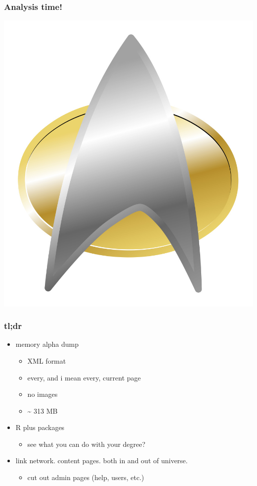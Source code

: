 \documentclass{beamer}
\begin{document}
\begin{frame}
  \frametitle{Analysis time!}
  \begin{center}
    \includegraphics[height = 0.8\textheight, width = \textwidth, keepaspectratio = true]{figure/star-trek-insignia}
  \end{center}
\end{frame}

\begin{frame}
  \frametitle{tl;dr}
  \begin{itemize}
    \item memory alpha dump
      \begin{itemize}
        \item XML format
        \item every, and i mean every, current page
        \item no images
        \item \~{} 313 MB
      \end{itemize}
    \item R plus packages
      \begin{itemize}
        \item see what you can do with your degree?
      \end{itemize}
    \item link network. content pages. both in and out of universe.
      \begin{itemize}
        \item cut out admin pages (help, users, etc.)
      \end{itemize}
  \end{itemize}
\end{frame}
\end{document}
